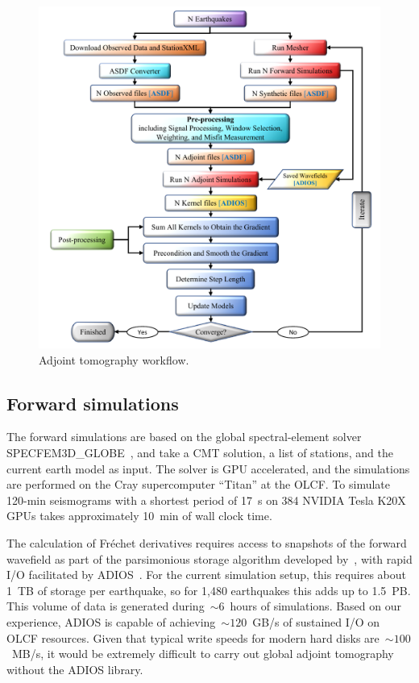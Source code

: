 \documentclass[extra,mreferee]{gji}
\begin{document}
\begin{figure}
  \centering
  \includegraphics[width=\textwidth]{figures/adjoint_workflow_6.pdf}
  \caption{\small{Adjoint tomography workflow.}}
  \label{fig:adjoint_workflow}
\end{figure}

\subsection{Forward simulations}

The forward simulations are based on the global spectral-element solver
SPECFEM3D\_GLOBE~\citep{KoTr02a,KoTr02a}, and take a CMT solution, a list
of stations, and the current earth model as input.
The solver is GPU accelerated, and the simulations are performed on the Cray supercomputer ``Titan''
at the OLCF.
To simulate 120-min seismograms with a shortest period of 17~s on 384 NVIDIA
Tesla K20X GPUs takes approximately 10~min of wall clock time.

The calculation of Fr\'echet derivatives requires
access to snapshots of the forward wavefield as part of the parsimonious storage
algorithm developed by~\cite{KoXiBoPeSaLiTr16},
with rapid I/O facilitated by ADIOS~\citep{liu2014hello}.
For the current simulation setup,
this requires about 1~TB of storage per earthquake,
so for 1,480 earthquakes this adds up to 1.5~PB.
This volume of data is generated during~$\sim6$~hours of simulations.
Based on our experience, ADIOS is capable of achieving~$\sim120$~GB/s
of sustained I/O on OLCF resources.
Given that typical write speeds for modern hard disks are~$\sim100$~MB/s,
it would be extremely difficult to carry out global adjoint tomography without the ADIOS library.
\end{document}
